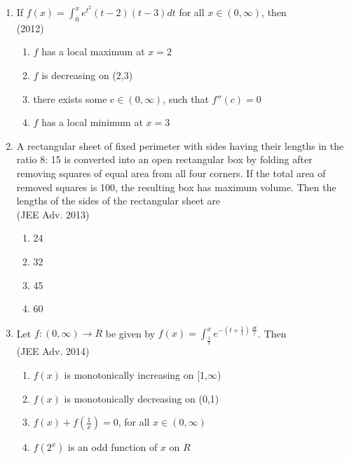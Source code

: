 \documentclass[journal,12pt,twocolumn]{IEEEtran}
\theoremstyle{remark}
\begin{document}
\begin{enumerate}
{        }
    \item{
        
            If $f(x)= \int_{0}^x e^{t^2}(t-2)(t-3)dt$ for all $x \in(0,\infty)$, then
            \\ \text{   } \hfill
                {(2012)}
            
            \begin{enumerate}
                \item $f$ has a local maximum at $x=2$ 
                \item $f$ is decreasing on (2,3)
                \item there exists some c$\in(0,\infty)$, such that $f''(c)=0$
                \item $f$ has a local minimum at $x=3$
            \end{enumerate}
        
        }
        \newpage
    \item{
    
        
            A rectangular sheet of fixed perimeter with sides having their lengths in the ratio 8: 15 is converted into an open rectangular box by folding after removing squares of equal area from all four corners. If the total area of removed squares is 100, the resulting box has maximum volume. Then the lengths of the sides of the rectangular sheet are
            \\ \text{   } \hfill
                {(JEE Adv. 2013)}
            
            \begin{enumerate}
                \item 24
                \item 32
                \item 45
                \item 60
            \end{enumerate}
        
        }
    \item{
        
            Let $f: (0,\infty)\rightarrow R$ be given by $f(x) = \int_{\frac{1}{x}}^x e^{-(t + \frac{1}{t})\ \frac{dt}{t}}$. Then
            \\ \text{   } \hfill
                {(JEE Adv. 2014)}
            
            \begin{enumerate}
                \item $f(x)$ is monotonically increasing on [1,$\infty$)
                \item $f(x)$ is monotonically decreasing on (0,1)
                \item $f(x) + f(\frac{1}{x}) = 0$, for all $x \in (0,\infty)$
                \item $f(2^x)$ is an odd function of $x$ on $R$ 
            \end{enumerate}
        
}
\end{enumerate}
\end{document}
